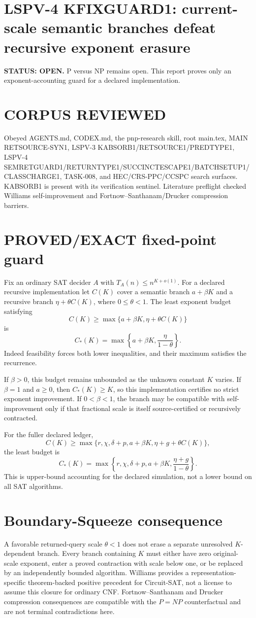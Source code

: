 \documentclass[11pt]{article}
\begin{document}
\section*{LSPV-4 KFIXGUARD1: current-scale semantic branches defeat recursive exponent erasure}
\textbf{STATUS: OPEN.} P versus NP remains open. This report proves only an exponent-accounting guard for a declared implementation.

\section*{CORPUS REVIEWED}
Obeyed AGENTS.md, CODEX.md, the pnp-research skill, root main.tex, MAIN RETSOURCE-SYN1, LSPV-3 KABSORB1/RETSOURCE1/PREDTYPE1, LSPV-4 SEMRETGUARD1/RETURNTYPE1/SUCCINCTESCAPE1/BATCHSETUP1/CLASSCHARGE1, TASK-008, and HEC/CRS-PPC/CCSPC search surfaces. KABSORB1 is present with its verification sentinel. Literature preflight checked Williams self-improvement and Fortnow--Santhanam/Drucker compression barriers.

\section*{PROVED/EXACT fixed-point guard}
Fix an ordinary SAT decider $A$ with $T_A(n)\le n^{K+o(1)}$. For a declared recursive implementation let $C(K)$ cover a semantic branch $a+\beta K$ and a recursive branch $\eta+\theta C(K)$, where $0\le\theta<1$. The least exponent budget satisfying
\[
C(K)\ge\max\{a+\beta K,\eta+\theta C(K)\}
\]
is
\[
\boxed{C_*(K)=\max\left\{a+\beta K,\frac{\eta}{1-\theta}\right\}.}
\]
Indeed feasibility forces both lower inequalities, and their maximum satisfies the recurrence.

If $\beta>0$, this budget remains unbounded as the unknown constant $K$ varies. If $\beta=1$ and $a\ge0$, then $C_*(K)\ge K$, so this implementation certifies no strict exponent improvement. If $0<\beta<1$, the branch may be compatible with self-improvement only if that fractional scale is itself source-certified or recursively contracted.

For the fuller declared ledger,
\[
C(K)\ge\max\{r,\chi,\delta+p,a+\beta K,\eta+g+\theta C(K)\},
\]
the least budget is
\[
\boxed{C_*(K)=\max\left\{r,\chi,\delta+p,a+\beta K,\frac{\eta+g}{1-\theta}\right\}.}
\]
This is upper-bound accounting for the declared simulation, not a lower bound on all SAT algorithms.

\section*{Boundary-Squeeze consequence}
A favorable returned-query scale $\theta<1$ does not erase a separate unresolved $K$-dependent branch. Every branch containing $K$ must either have zero original-scale exponent, enter a proved contraction with scale below one, or be replaced by an independently bounded algorithm. Williams provides a representation-specific theorem-backed positive precedent for Circuit-SAT, not a license to assume this closure for ordinary CNF. Fortnow--Santhanam and Drucker compression consequences are compatible with the $P=NP$ counterfactual and are not terminal contradictions here.
\end{document}
